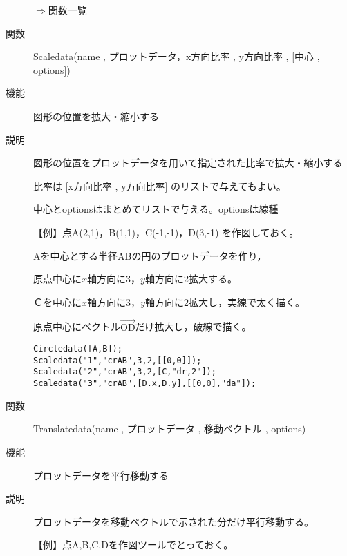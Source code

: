 \documentclass[papersize,a4paper,10pt,uplatex]{jsarticle}
\begin{document}
\begin{description}
\begin{flushright}\hyperlink{functionlist}{$\Rightarrow$関数一覧}\end{flushright}

\vspace{\baselineskip}
\hypertarget{scaledata}{}
\item[関数]Scaledata(name , プロットデータ，x方向比率 , y方向比率 , [中心 , options])
\item[機能]図形の位置を拡大・縮小する
\item[説明]図形の位置をプロットデータを用いて指定された比率で拡大・縮小する

比率は [x方向比率 , y方向比率] のリストで与えてもよい。

中心とoptionsはまとめてリストで与える。optionsは線種

\vspace{\baselineskip}
【例】点A(2,1)，B(1,1)，C(-1,-1)，D(3,-1) を作図しておく。

 Aを中心とする半径ABの円のプロットデータを作り，

原点中心に$x$軸方向に3，$y$軸方向に2拡大する。

Ｃを中心に$x$軸方向に3，$y$軸方向に2拡大し，実線で太く描く。

原点中心にベクトル$\overrightarrow{\mathrm{OD}} $だけ拡大し，破線で描く。
\begin{verbatim}
Circledata([A,B]);
Scaledata("1","crAB",3,2,[[0,0]]);
Scaledata("2","crAB",3,2,[C,"dr,2"]);
Scaledata("3","crAB",[D.x,D.y],[[0,0],"da"]);
\end{verbatim}

\vspace{0mm}
 \begin{center}  \end{center}


\vspace{\baselineskip}
\hypertarget{translatedata}{}
\item[関数]Translatedata(name , プロットデータ , 移動ベクトル , options)
\item[機能]プロットデータを平行移動する
\item[説明]プロットデータを移動ベクトルで示された分だけ平行移動する。

\vspace{\baselineskip}
【例】点A,B,C,Dを作図ツールでとっておく。


\end{description}
\end{document}
